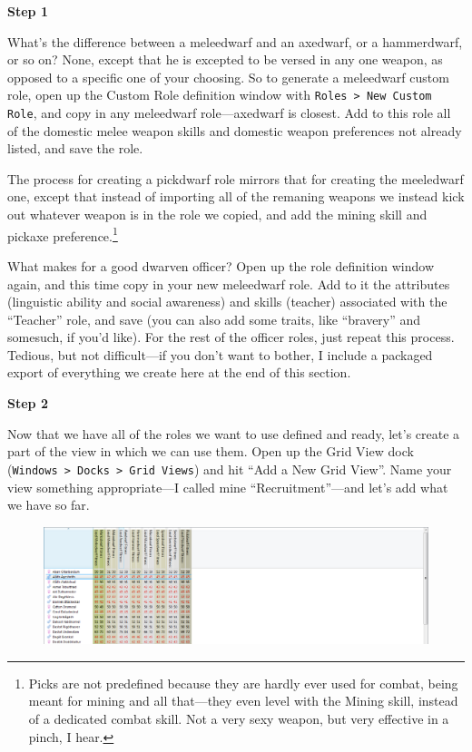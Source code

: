 \documentclass[]{article}
\newcommand{\step}[1] {
\vspace{12pt}
\noindent \textbf{Step #1}
}
\begin{document}
\step{1}
What's the difference between a meleedwarf and an axedwarf, or a hammerdwarf, or so on? None, except that
he is excepted to be versed in any one weapon, as opposed to a specific one of your choosing. So to
generate a meleedwarf custom role, open up the Custom Role definition window with \texttt{Roles > New
Custom Role}, and copy in any meleedwarf role---axedwarf is closest. Add to this role all of the
domestic melee weapon skills and domestic weapon preferences not already listed, and save the role.

The process for creating a pickdwarf role mirrors that for creating the meeledwarf one, except that
instead of importing all of the remaning weapons we instead kick out whatever weapon is in the role we
copied, and add the mining skill and pickaxe preference.\footnote{Picks are not predefined because they
are hardly ever used for combat, being meant for mining and all that---they even level with the
Mining skill, instead of a dedicated combat skill. Not a very sexy weapon, but very effective in a
pinch, I hear.}

What makes for a good dwarven officer? Open up the role definition window again, and this time copy in
your new meleedwarf role. Add to it the attributes (linguistic ability and social awareness) and skills
(teacher) associated with the ``Teacher'' role, and save (you can also add some traits, like ``bravery''
and somesuch, if you'd like). For the rest of the officer roles, just repeat this process. Tedious, but
not difficult---if you don't want to bother, I include a packaged export of everything we create here at
the end of this section.

\step{2}
Now that we have all of the roles we want to use defined and ready, let's create a part of the
view in which we can use them. Open up the Grid View dock (\texttt{Windows > Docks > Grid Views}) and
hit ``Add a New Grid View''. Name your view something appropriate---I called mine ``Recruitment''---and
let's add what we have so far.

\begin{figure}[h!]
\includegraphics[width=\linewidth]{Sec5Fig2}
\end{figure}
\end{document}
